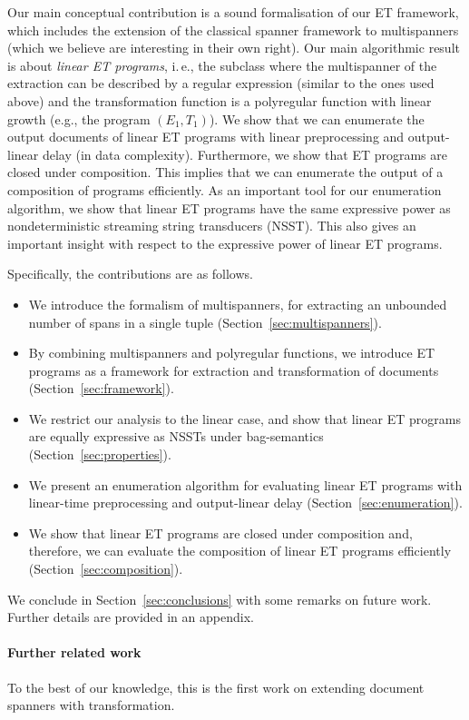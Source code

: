 \documentclass[
a4paper
]{article}
\theoremstyle{plain}
\theoremstyle{definition}
\theoremstyle{remark}
\newcommand{\firstExampleEx}{E_1}
\newcommand{\firstExampleTrans}{T_1}
\begin{document}
Our main conceptual contribution is a sound formalisation of our ET framework, which includes the extension of the classical spanner framework to multispanners (which we believe are interesting in their own right). Our main algorithmic result is about \emph{linear ET programs}, i.\,e., the subclass where the multispanner of the extraction can be described by a regular expression (similar to the ones used above) and the transformation function is a polyregular function with linear growth (e.g., the program $(\firstExampleEx, \firstExampleTrans)$). We show that we can enumerate the output documents of linear ET programs with linear preprocessing and output-linear delay (in data complexity). Furthermore, we show that ET programs are closed under composition.
This implies
that we can enumerate the output of a composition of programs efficiently. 
As an important tool for our enumeration algorithm, we show that linear ET programs have the same expressive power as nondeterministic streaming string transducers (NSST). This also gives an important insight with respect to the expressive power of linear ET programs.

Specifically, the contributions are as follows.
\begin{itemize}
	\item We introduce the formalism of multispanners, for extracting an unbounded number of spans in a single  tuple (Section~\ref{sec:multispanners}).
	\item By combining multispanners and polyregular functions, we introduce ET programs as a framework for extraction and transformation of documents (Section~\ref{sec:framework}).
	\item We restrict our analysis to the linear case, and show that linear ET programs are equally expressive as NSSTs under bag-semantics (Section~\ref{sec:properties}).
	\item We present an enumeration algorithm for evaluating linear ET programs with linear-time preprocessing and output-linear delay (Section~\ref{sec:enumeration}).
	\item
          We show
          that linear ET programs are closed under composition and, therefore, we can evaluate the composition of linear ET programs efficiently (Section~\ref{sec:composition}).
\end{itemize}
We conclude in Section~\ref{sec:conclusions} with some remarks
on future work.
Further details are provided in an appendix.

\paragraph{Further related work}
To the best of our knowledge, this is the first work on extending document spanners with transformation. 
\end{document}
